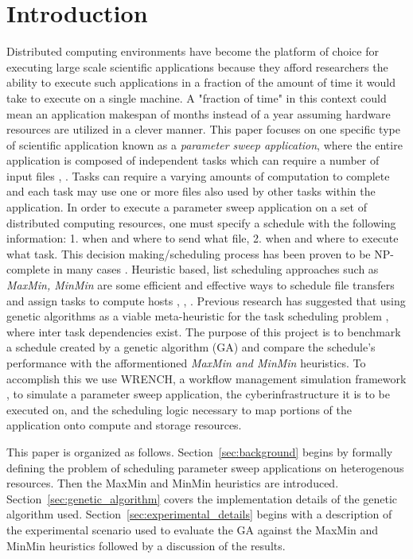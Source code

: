 \section{Introduction}

Distributed computing environments have become the platform of choice for
executing large scale scientific applications because they afford researchers
the ability to execute such applications in a fraction of the amount of time it
would take  to execute on a single machine. A "fraction of time" in this context
could mean an application makespan of months instead of a year assuming hardware
resources are utilized in a clever manner.  This paper focuses on one specific
type of scientific application known as a \textit{parameter sweep application},
where the entire application is composed of independent tasks which can require
a number of input files  \cite{Casanova-param-sweep-00},
\cite{Casanova-apples-param-sweep-00}. Tasks can require a varying amounts of
computation to complete and each task may use one or more files also used by
other tasks within the application. In order to execute a parameter sweep
application on a set of distributed computing resources, one must specify a
schedule with the following information: 1. when and where to send what file, 2.
when and where to execute what task. This decision making/scheduling process has
been proven to be NP-complete in many cases
\cite{Giersch-task-sharing-files-04}. Heuristic based, list scheduling
approaches such as \textit{MaxMin, MinMin} are some efficient and effective ways
to schedule file transfers and assign tasks to compute hosts
\cite{Casanova-param-sweep-00}, \cite{Casanova-apples-param-sweep-00},
\cite{Giersch-task-sharing-files-04}. Previous research has suggested that using
genetic algorithms as a viable meta-heuristic for the task scheduling problem
\cite{wang-task-matching-97} , \cite{wu-incremental-genetic-04} where inter task
dependencies exist. The purpose of this project is to benchmark a schedule
created by a genetic algorithm (GA) and compare the schedule's performance with
the afformentioned \textit{MaxMin and MinMin} heuristics. To accomplish this we
use WRENCH, a workflow management simulation framework
\cite{casanova-works-2018}, to simulate a parameter sweep application, the
cyberinfrastructure it is to be executed on, and the scheduling logic necessary
to map portions of the application onto compute and storage resources.

This paper is organized as follows. Section~\ref{sec:background} begins by
formally defining the problem of scheduling parameter sweep applications on
heterogenous resources. Then the MaxMin and MinMin heuristics are introduced.
Section~\ref{sec:genetic_algorithm} covers the implementation details of
the genetic algorithm used. Section~\ref{sec:experimental_details} begins with
a description of the experimental scenario used to evaluate the GA against
the MaxMin and MinMin heuristics followed by a discussion of the results.
